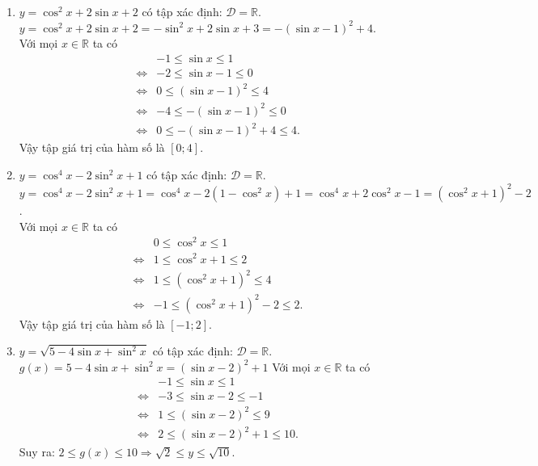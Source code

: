 \begin{bt}
{\begin{enumerate}
		\item $y=\cos ^{2} x+2 \sin x+2$ có tập xác định: $\mathscr{D}=\mathbb{R}$.\\
		$y=\cos ^{2} x+2 \sin x+2=-\sin^2 x+2\sin x+3=-\left(\sin x-1\right)^2+4 $.\\
		Với mọi $x\in \mathbb{R}$ ta có
		\allowdisplaybreaks
		\begin{eqnarray*}
			& & -1\leq \sin x\leq 1\\
			&\Leftrightarrow& -2\leq \sin x-1\leq 0\\
			&\Leftrightarrow&0\leq \left( \sin x-1\right)^2\leq 4\\
			&\Leftrightarrow&-4\leq -\left( \sin x-1\right)^2\leq 0\\
			&\Leftrightarrow&0\leq -\left( \sin x-1\right)^2+4\leq 4.
		\end{eqnarray*}
		Vậy tập giá trị của hàm số là $[0;4]$.
		\item $y=\cos ^{4} x-2 \sin ^{2} x+1$ có tập xác định: $\mathscr{D}=\mathbb{R}$.\\
		 $y=\cos ^{4} x-2 \sin ^{2} x+1=\cos ^{4} x-2 \left(1-\cos^2 x\right)+1=\cos ^{4} x+2 \cos ^{2} x-1=\left(\cos^2 x+1\right)^2-2 $.\\
		Với mọi $x\in \mathbb{R}$ ta có
		\allowdisplaybreaks
		\begin{eqnarray*}
			& & 0\leq \cos^2 x\leq 1\\
			&\Leftrightarrow& 1\leq \cos^2 x+1\leq 2\\
			&\Leftrightarrow&1\leq \left( \cos^2 x+1\right)^2\leq 4\\
			&\Leftrightarrow&-1\leq \left( \cos^2 x+1\right)^2-2\leq 2.
		\end{eqnarray*}
		Vậy tập giá trị của hàm số là $[-1;2]$.
		\item $y=\sqrt{5-4 \sin x+\sin ^{2} x}$ có tập xác định: $\mathscr{D}=\mathbb{R}$.\\
		$g(x)=5-4 \sin x+\sin ^{2} x=\left(\sin x -2\right)^2+1$
		Với mọi $x\in \mathbb{R}$ ta có
		\allowdisplaybreaks
		\begin{eqnarray*}
			& & -1\leq \sin  x\leq 1\\
			&\Leftrightarrow&-3\leq \sin x-2\leq -1\\
			&\Leftrightarrow&1\leq \left( \sin x-2\right)^2\leq 9\\
			&\Leftrightarrow&2\leq  \left( \sin x-2\right)^2+1\leq 10.
		\end{eqnarray*}
		Suy ra: $2\leq g(x)\leq 10 \Rightarrow \sqrt{2}\leq y\leq \sqrt{10}$.\\

\end{enumerate}}
\end{bt}
